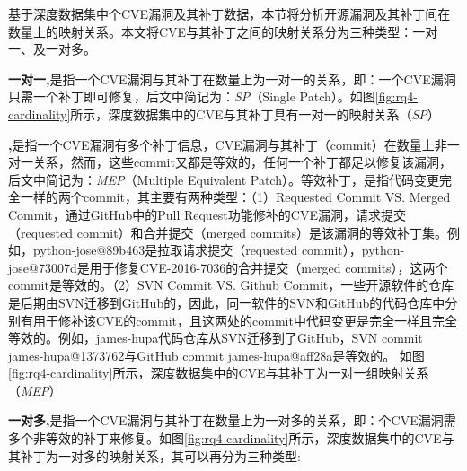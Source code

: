 基于深度数据集中个CVE漏洞及其补丁数据，本节将分析开源漏洞及其补丁间在数量上的映射关系。本文将CVE与其补丁之间的映射关系分为三种类型：一对一、及一对多。

\textbf{一对一,}是指一个CVE漏洞与其补丁在数量上为一对一的关系，即：一个CVE漏洞只需一个补丁即可修复，后文中简记为：\textit{SP}（Single Patch）。如图\ref{fig:rq4-cardinality}所示，深度数据集中的CVE与其补丁具有一对一的映射关系（\textit{SP}）

\textbf{,}是指一个CVE漏洞有多个补丁信息，CVE漏洞与其补丁（commit）在数量上非一对一关系，然而，这些commit又都是等效的，任何一个补丁都足以修复该漏洞，后文中简记为：\textit{MEP}（Multiple Equivalent Patch）。等效补丁，是指代码变更完全一样的两个commit，其主要有两种类型：（1）Requested Commit VS. Merged Commit，通过GitHub中的Pull Request功能修补的CVE漏洞，请求提交（requested commit）和合并提交（merged commits）是该漏洞的等效补丁集。例如，python-jose@89b463\cite{python-jose-1}是拉取请求提交（requested commit），python-jose@73007d\cite{python-jose-2}是用于修复CVE-2016-7036的合并提交（merged commits），这两个commit是等效的。（2）SVN Commit VS. Github Commit，一些开源软件的仓库是后期由SVN迁移到GitHub的，因此，同一软件的SVN和GitHub的代码仓库中分别有用于修补该CVE的commit，且这两处的commit中代码变更是完全一样且完全等效的。例如，james-hupa代码仓库从SVN迁移到了GitHub，SVN commit james-hupa@1373762\cite{james-hupa-1}与GitHub commit james-hupa@aff28a\cite{james-hupa-2}是等效的。
如图\ref{fig:rq4-cardinality}所示，深度数据集中的CVE与其补丁为一对一组映射关系（\textit{MEP}）

\textbf{一对多,}是指一个CVE漏洞与其补丁在数量上为一对多的关系，即：个CVE漏洞需多个非等效的补丁来修复。如图\ref{fig:rq4-cardinality}所示，深度数据集中的CVE与其补丁为一对多的映射关系，其可以再分为三种类型: 

